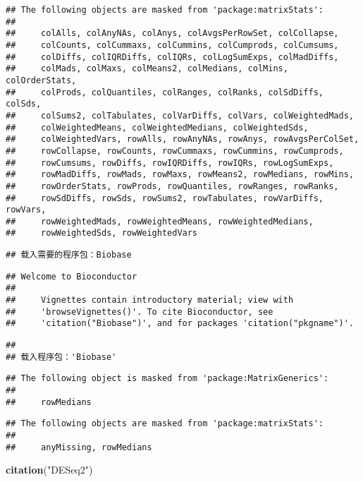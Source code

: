 \documentclass[
]{article}
\newenvironment{Shaded}{\begin{snugshade}}{\end{snugshade}}
\newcommand{\FunctionTok}[1]{\textcolor[rgb]{0.13,0.29,0.53}{\textbf{#1}}}
\newcommand{\NormalTok}[1]{#1}
\newcommand{\StringTok}[1]{\textcolor[rgb]{0.31,0.60,0.02}{#1}}
\begin{document}
\begin{verbatim}
## The following objects are masked from 'package:matrixStats':
## 
##     colAlls, colAnyNAs, colAnys, colAvgsPerRowSet, colCollapse,
##     colCounts, colCummaxs, colCummins, colCumprods, colCumsums,
##     colDiffs, colIQRDiffs, colIQRs, colLogSumExps, colMadDiffs,
##     colMads, colMaxs, colMeans2, colMedians, colMins, colOrderStats,
##     colProds, colQuantiles, colRanges, colRanks, colSdDiffs, colSds,
##     colSums2, colTabulates, colVarDiffs, colVars, colWeightedMads,
##     colWeightedMeans, colWeightedMedians, colWeightedSds,
##     colWeightedVars, rowAlls, rowAnyNAs, rowAnys, rowAvgsPerColSet,
##     rowCollapse, rowCounts, rowCummaxs, rowCummins, rowCumprods,
##     rowCumsums, rowDiffs, rowIQRDiffs, rowIQRs, rowLogSumExps,
##     rowMadDiffs, rowMads, rowMaxs, rowMeans2, rowMedians, rowMins,
##     rowOrderStats, rowProds, rowQuantiles, rowRanges, rowRanks,
##     rowSdDiffs, rowSds, rowSums2, rowTabulates, rowVarDiffs, rowVars,
##     rowWeightedMads, rowWeightedMeans, rowWeightedMedians,
##     rowWeightedSds, rowWeightedVars
\end{verbatim}

\begin{verbatim}
## 载入需要的程序包：Biobase
\end{verbatim}

\begin{verbatim}
## Welcome to Bioconductor
## 
##     Vignettes contain introductory material; view with
##     'browseVignettes()'. To cite Bioconductor, see
##     'citation("Biobase")', and for packages 'citation("pkgname")'.
\end{verbatim}

\begin{verbatim}
## 
## 载入程序包：'Biobase'
\end{verbatim}

\begin{verbatim}
## The following object is masked from 'package:MatrixGenerics':
## 
##     rowMedians
\end{verbatim}

\begin{verbatim}
## The following objects are masked from 'package:matrixStats':
## 
##     anyMissing, rowMedians
\end{verbatim}

\begin{Shaded}
\begin{Highlighting}[]
\FunctionTok{citation}\NormalTok{(}\StringTok{"DESeq2"}\NormalTok{)}
\end{Highlighting}
\end{Shaded}
\end{document}
